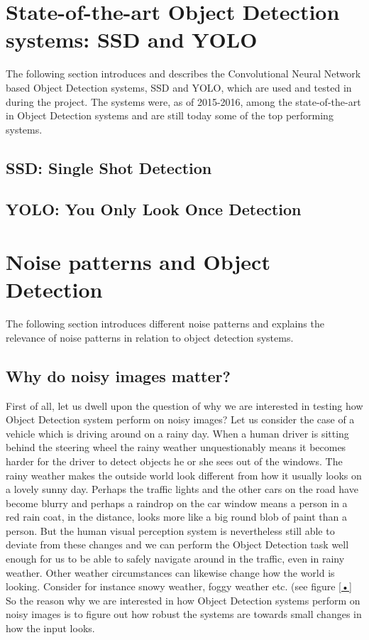 \documentclass{article}
\begin{document}
\section{State-of-the-art Object Detection systems: SSD and YOLO}
The following section introduces and describes the Convolutional Neural Network based Object Detection systems, SSD \cite{SSD} and YOLO\cite{YOLO}, which are used and tested in during the project. The systems were, as of 2015-2016, among the state-of-the-art in Object Detection systems and are still today some of the top performing systems.

\subsection{SSD: Single Shot Detection}

\subsection{YOLO: You Only Look Once Detection}


\section{Noise patterns and Object Detection}
The following section introduces different noise patterns and explains the relevance of noise patterns in relation to object detection systems.

\subsection{Why do noisy images matter?}
First of all, let us dwell upon the question of why we are interested in testing how Object Detection system perform on noisy images? Let us consider the case of a vehicle which is driving around on a rainy day. When a human driver is sitting behind the steering wheel the rainy weather unquestionably means it becomes harder for the driver to detect objects he or she sees out of the windows. The rainy weather makes the outside world look different from how it usually looks on a lovely sunny day. Perhaps the traffic lights and the other cars on the road have become blurry and perhaps a raindrop on the car window means a person in a red rain coat, in the distance, looks more like a big round blob of paint than a person. But the human visual perception system is nevertheless still able to deviate from these changes and we can perform the Object Detection task well enough for us to be able to safely navigate around in the traffic, even in rainy weather. Other weather circumstances can likewise change how the world is looking. Consider for instance snowy weather, foggy weather etc. (see figure \ref{•}
So the reason why we are interested in how Object Detection systems perform on noisy images is to figure out how robust the systems are towards small changes in how the input looks. 
\end{document}
